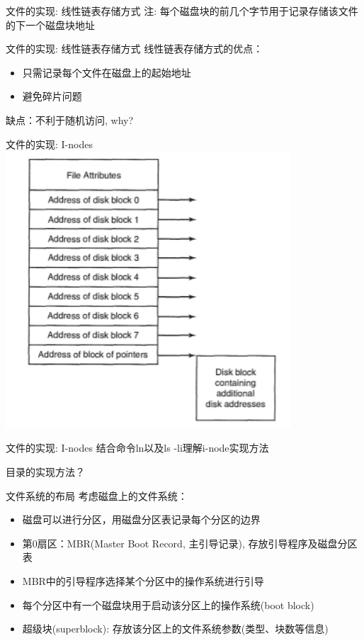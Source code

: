 \documentclass[xcolor=svgnames]{beamer}
\begin{document}
\begin{CJK*}{UTF8}{gbsn}
\begin{frame}{文件的实现: 线性链表存储方式}
\alert{注}: 每个磁盘块的前几个字节用于记录存储该文件的下一个磁盘块地址
\end{frame}

\begin{frame}{文件的实现: 线性链表存储方式}
线性链表存储方式的优点：
\begin{itemize}
\item 只需记录每个文件在磁盘上的起始地址
\item 避免碎片问题
\end{itemize}

缺点：不利于随机访问, why?
\end{frame}

\begin{frame}{文件的实现: I-nodes}
\includegraphics[width=0.8\textwidth]{inodes.png}
\end{frame}

\begin{frame}{文件的实现: I-nodes}
结合命令ln以及ls -li理解i-node实现方法

目录的实现方法？
\end{frame}

\begin{frame}{文件系统的布局}
考虑磁盘上的文件系统：
\begin{itemize}
\item 磁盘可以进行分区，用磁盘分区表记录每个分区的边界
\item 第0扇区：MBR(Master Boot Record, 主引导记录), 存放引导程序及磁盘分区表
\item MBR中的引导程序选择某个分区中的操作系统进行引导
\item 每个分区中有一个磁盘块用于启动该分区上的操作系统(boot block)
\item 超级块(superblock): 存放该分区上的文件系统参数(类型、块数等信息)
\end{itemize}
\end{frame}


\end{CJK*}
\end{document}

